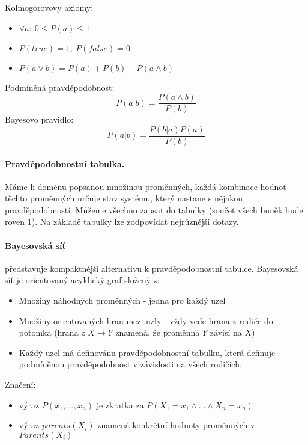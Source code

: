 \documentclass[a4paper]{article}      %
\newenvironment{definition}[1][Definice]{\begin{trivlist}
\item[\hskip \labelsep {\bfseries #1}]}{\end{trivlist}}
\begin{document}
\begin{definition}[Základy pravděpodobnosti]
Kolmogorovovy axiomy:
\begin{itemize}
\item $\forall a:\ 0 \leq P(a) \leq 1$
\item $P(true) = 1,\ P(false) = 0$
\item $P(a \vee b) = P(a) + P(b) - P(a \wedge b)$
\end{itemize}
Podmíněná pravděpodobnost:
\[
P(a|b) = \frac{P(a \wedge b)}{P(b)}
\]
Bayesovo pravidlo:
\[
P(a|b)= \frac{P(b|a)P(a)}{P(b)}
\]
\end{definition}

\paragraph{Pravděpodobnostní tabulka.}
Máme-li doménu popsanou množinou proměnných, každá kombinace hodnot těchto proměnných určuje stav systému, který nastane s nějakou pravděpodobností. Můžeme všechno zapsat do tabulky (součet všech buněk bude roven 1). Na základě tabulky lze zodpovídat nejrůznější dotazy.

\paragraph{Bayesovská síť} představuje kompaktnější alternativu k pravděpodobnostní tabulce.
Bayesovská síť je orientovaný acyklický graf složený z:
\begin{itemize}
\item Množiny náhodných proměnných - jedna pro každý uzel
\item Množiny orientovaných hran mezi uzly - vždy vede hrana z rodiče do potomka
(hrana z $X \rightarrow Y$ znamená, že proměnná $Y$ závisí na $X$)
\item Každý uzel má definovánu pravděpodobnostní tabulku, která definuje podmíněnou pravděpodobnost v závislosti na všech rodičích.
\end{itemize}

Značení:
\begin{itemize}
\item výraz $P(x_1,\ldots,x_n)$ je zkratka za $P(X_1 = x_1 \wedge \ldots \wedge X_n = x_n)$
\item výraz $parents(X_i)$ znamená konkrétní hodnoty proměnných v $Parents(X_i)$
\end{itemize}
\end{document}
